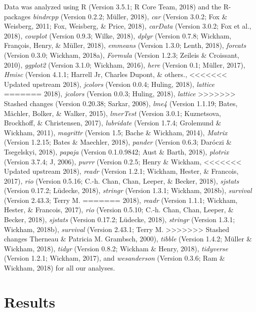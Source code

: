 \documentclass[man, fleqn, noextraspace]{apa6}
\theoremstyle{definition}
\theoremstyle{definition}
\theoremstyle{definition}
\theoremstyle{remark}
\begin{document}
Data was analyzed using R (Version 3.5.1; R Core Team, 2018) and the
R-packages \emph{bindrcpp} (Version 0.2.2; Müller, 2018), \emph{car}
(Version 3.0.2; Fox \& Weisberg, 2011; Fox, Weisberg, \& Price, 2018),
\emph{carData} (Version 3.0.2; Fox et al., 2018), \emph{cowplot}
(Version 0.9.3; Wilke, 2018), \emph{dplyr} (Version 0.7.8; Wickham,
François, Henry, \& Müller, 2018), \emph{emmeans} (Version 1.3.0; Lenth,
2018), \emph{forcats} (Version 0.3.0; Wickham, 2018a), \emph{Formula}
(Version 1.2.3; Zeileis \& Croissant, 2010), \emph{ggplot2} (Version
3.1.0; Wickham, 2016), \emph{here} (Version 0.1; Müller, 2017),
\emph{Hmisc} (Version 4.1.1; Harrell Jr, Charles Dupont, \& others.,
<<<<<<< Updated upstream
2018), \emph{jcolors} (Version 0.0.4; Huling, 2018), \emph{lattice}
=======
2018), \emph{jcolors} (Version 0.0.3; Huling, 2018), \emph{lattice}
>>>>>>> Stashed changes
(Version 0.20.38; Sarkar, 2008), \emph{lme4} (Version 1.1.19; Bates,
Mächler, Bolker, \& Walker, 2015), \emph{lmerTest} (Version 3.0.1;
Kuznetsova, Brockhoff, \& Christensen, 2017), \emph{lubridate} (Version
1.7.4; Grolemund \& Wickham, 2011), \emph{magrittr} (Version 1.5; Bache
\& Wickham, 2014), \emph{Matrix} (Version 1.2.15; Bates \& Maechler,
2018), \emph{pander} (Version 0.6.3; Daróczi \& Tsegelskyi, 2018),
\emph{papaja} (Version 0.1.0.9842; Aust \& Barth, 2018), \emph{plotrix}
(Version 3.7.4; J, 2006), \emph{purrr} (Version 0.2.5; Henry \& Wickham,
<<<<<<< Updated upstream
2018), \emph{readr} (Version 1.2.1; Wickham, Hester, \& Francois, 2017),
\emph{rio} (Version 0.5.16; C.-h. Chan, Chan, Leeper, \& Becker, 2018),
\emph{sjstats} (Version 0.17.2; Lüdecke, 2018), \emph{stringr} (Version
1.3.1; Wickham, 2018b), \emph{survival} (Version 2.43.3; Terry M.
=======
2018), \emph{readr} (Version 1.1.1; Wickham, Hester, \& Francois, 2017),
\emph{rio} (Version 0.5.10; C.-h. Chan, Chan, Leeper, \& Becker, 2018),
\emph{sjstats} (Version 0.17.2; Lüdecke, 2018), \emph{stringr} (Version
1.3.1; Wickham, 2018b), \emph{survival} (Version 2.43.1; Terry M.
>>>>>>> Stashed changes
Therneau \& Patricia M. Grambsch, 2000), \emph{tibble} (Version 1.4.2;
Müller \& Wickham, 2018), \emph{tidyr} (Version 0.8.2; Wickham \& Henry,
2018), \emph{tidyverse} (Version 1.2.1; Wickham, 2017), and
\emph{wesanderson} (Version 0.3.6; Ram \& Wickham, 2018) for all our
analyses.

\section{Results}\label{results}
\end{document}
